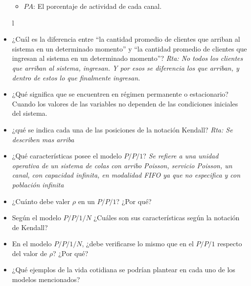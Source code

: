 \documentclass{article}
\begin{document}
\begin{itemize}
\begin{itemize}
            \item \(PA\): El porcentaje de actividad de cada canal.
        \end{itemize}
l    \item ¿Cuál es la diferencia entre “la cantidad promedio de clientes que arriban al sistema en un determinado momento” y “la cantidad promedio de clientes que ingresan al sistema en un determinado momento”?
        \textit{Rta: No todos los clientes que arriban al sistema, ingresan. Y por esos se diferencia los que arriban, y dentro de estos lo que finalmente ingresan.}
    \item ¿Qué significa que se encuentren en régimen permanente o estacionario?
        Cuando los valores de las variables no dependen de las condiciones iniciales del sistema.        
    \item ¿qué se indica cada una de las posiciones de la notación Kendall?
        \textit{Rta: Se describen mas arriba}
    \item ¿Qué características posee el modelo \(P/P/1\)?
        \textit{Se refiere a una unidad operativa de un sistema de colas con arribo Poisson, servicio Poisson, un canal, con capacidad infinita, en modalidad FIFO ya que no especifica y con población infinita}
    \item ¿Cuánto debe valer \(\rho\) en un \(P/P/1\)? ¿Por qué?
        
    \item Según el modelo \(P/P/1/N\) ¿Cuáles son sus características según la notación de Kendall?
    \item En el modelo \(P/P/1/N\), ¿debe verificarse lo mismo que en el \(P/P/1\) respecto del valor de \(\rho\)? ¿Por qué?
    \item ¿Qué ejemplos de la vida cotidiana se podrían plantear en cada uno de los modelos mencionados?
\end{itemize}
\end{document}
